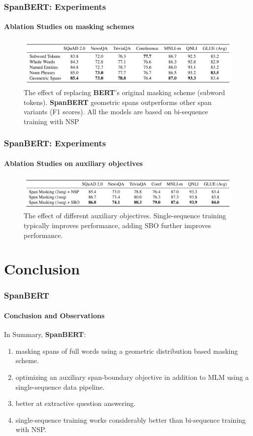 \documentclass[12pt]{beamer}
\begin{document}
	\begin{frame}
		\frametitle{SpanBERT: Experiments}
		\framesubtitle{Ablation Studies on masking schemes}
		
		\begin{figure}
			\centering
			\includegraphics[width=\textwidth]{abla1.png}
			\caption{The effect of replacing \textbf{BERT}'s original masking scheme (subword tokens). \textbf{SpanBERT} geometric spans outperforms other span variants (F1 scores). All the models are based on bi-sequence training with NSP}
		\end{figure}
		
	\end{frame}	
	
	\begin{frame}
		\frametitle{SpanBERT: Experiments}
		\framesubtitle{Ablation Studies on auxiliary objectives}
		
		\begin{figure}
			\centering
			\includegraphics[width=\textwidth]{abla2.png}
			\caption{The effect of different auxiliary objectives. Single-sequence training typically improves performance, adding SBO further improves performance.}
		\end{figure}
		
	\end{frame}	
	
	\section{Conclusion}
	\begin{frame}
		\frametitle{SpanBERT}
		\framesubtitle{Conclusion and Observations}
		\large
		In Summary, \textbf{SpanBERT}: \newline
		\begin{enumerate}
			\item masking spans of full words using a geometric distribution based masking scheme.
			\item optimizing an auxiliary span-boundary objective in addition to MLM using a single-sequence data pipeline. 
			\item better at extractive question answering. 
			\item single-sequence training works considerably better than bi-sequence training with NSP.
		\end{enumerate}
		
	\end{frame}
\end{document}
